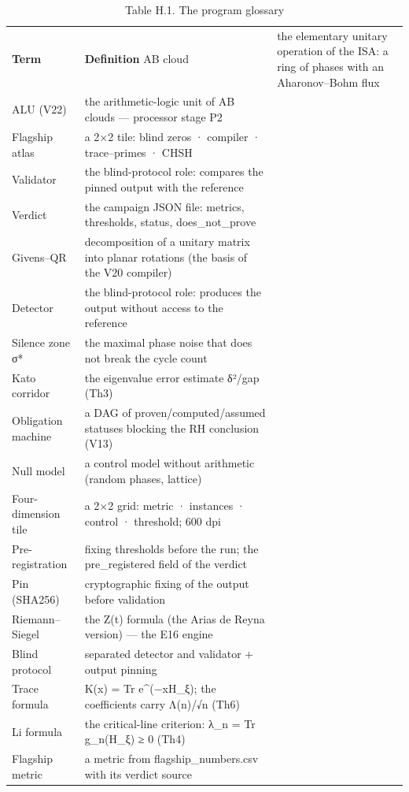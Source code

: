 \documentclass[11pt,a4paper]{article}
\begin{document}
\begin{table}[htbp]\centering\small
\caption{Table H.1. The program glossary}
\begin{tabular}{p{} p{}}
\toprule
\textbf{Term} & \textbf{Definition}
\midrule
AB cloud & the elementary unitary operation of the ISA: a ring of phases with an Aharonov–Bohm flux \\
ALU (V22) & the arithmetic-logic unit of AB clouds — processor stage P2 \\
Flagship atlas & a 2×2 tile: blind zeros · compiler · trace–primes · CHSH \\
Validator & the blind-protocol role: compares the pinned output with the reference \\
Verdict & the campaign JSON file: metrics, thresholds, status, does\_not\_prove \\
Givens–QR & decomposition of a unitary matrix into planar rotations (the basis of the V20 compiler) \\
Detector & the blind-protocol role: produces the output without access to the reference \\
Silence zone σ* & the maximal phase noise that does not break the cycle count \\
Kato corridor & the eigenvalue error estimate δ²/gap (Th3) \\
Obligation machine & a DAG of proven/computed/assumed statuses blocking the RH conclusion (V13) \\
Null model & a control model without arithmetic (random phases, lattice) \\
Four-dimension tile & a 2×2 grid: metric · instances · control · threshold; 600 dpi \\
Pre-registration & fixing thresholds before the run; the pre\_registered field of the verdict \\
Pin (SHA256) & cryptographic fixing of the output before validation \\
Riemann–Siegel & the Z(t) formula (the Arias de Reyna version) — the E16 engine \\
Blind protocol & separated detector and validator + output pinning \\
Trace formula & K(x) = Tr e\textasciicircum{}(−xH\_ξ); the coefficients carry Λ(n)/√n (Th6) \\
Li formula & the critical-line criterion: λ\_n = Tr g\_n(H\_ξ) ≥ 0 (Th4) \\
Flagship metric & a metric from flagship\_numbers.csv with its verdict source \\

\end{tabular}
\end{table}
\end{document}
